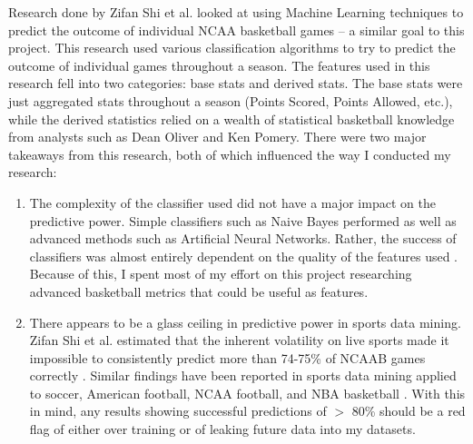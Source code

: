 \documentclass[]{article}
\begin{document}
Research done by Zifan Shi et al. looked at using Machine Learning techniques to predict the outcome of individual NCAA basketball games -- a similar goal to this project. This research used various classification algorithms to try to predict the outcome of individual games throughout a season. The features used in this research fell into two categories: base stats and derived stats. The base stats were just aggregated stats throughout a season (Points Scored, Points Allowed, etc.), while the derived statistics relied on a wealth of statistical basketball knowledge from analysts such as Dean Oliver and Ken Pomery. There were two major takeaways from this research, both of which influenced the way I conducted my research:
\begin{enumerate}
	\item The complexity of the classifier used did not have a major impact on the predictive power. Simple classifiers such as Naive Bayes performed as well as advanced methods such as Artificial Neural Networks. Rather, the success of classifiers was almost entirely dependent on the quality of the features used \cite{ncaaml}. Because of this, I spent most of my effort on this project researching advanced basketball metrics that could be useful as features.

	\item There appears to be a glass ceiling in predictive power in sports data mining. Zifan Shi et al. estimated that the inherent volatility on live sports made it impossible to consistently predict more than 74-75\% of NCAAB games correctly \cite{ncaaml}. Similar findings have been reported in sports data mining applied to soccer, American football, NCAA football, and NBA basketball \cite{ncaaml}. With this in mind, any results showing successful predictions of $>$ 80\% should be a red flag of either over training or of leaking future data into my datasets.
\end{enumerate}
       
\end{document}
